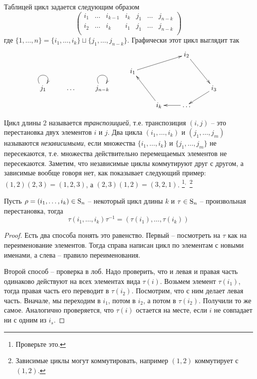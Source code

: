 Таблицей цикл задается следующим образом
\[
\begin{pmatrix}
{i_1}&{\ldots}&{i_{k-1}}&{i_k}&{j_1}&{\ldots}&{j_{n-k}}\\
{i_2}&{\ldots}&{i_k}&{i_1}&{j_{1}}&{\ldots}&{j_{n-k}}\\
\end{pmatrix}
\]
где $\{1,\ldots,n\} = \{i_1,\ldots,i_k\}\sqcup\{j_1,\ldots,j_{n-k}\}$.
Графически этот цикл выглядит так
\[
\xymatrix@R=10pt{
	{}&{}&{}&{}&{}&{i_2}\ar[rdd]&{}\\
	{}&{}&{}&{i_1}\ar[urr]&{}&{}&{}\\
	{j_1}\ar@(ul,ur)&{\ldots}&{j_{n-k}}\ar@(ul,ur)&{}&{}&{}&{i_3}\ar[dl]\\
	{}&{}&{}&{}&{i_k}\ar[uul]&{\ldots}\ar[l]&{}\\
}
\]

Цикл длины $2$ называется {\it транспозицией}, т.е. транспозиция $(i,j)$ -- это перестановка двух элементов $i$ и $j$.
Два цикла $(i_1,\ldots,i_k)$ и $(j_1,\ldots,j_m)$ называются {\it независимыми}, если множества $\{i_1,\ldots,i_k\}$ и $\{j_1,\ldots,j_m\}$ не пересекаются, т.е. множества действительно перемещаемых элементов не пересекаются.
Заметим, что независимые циклы коммутируют друг с другом, а зависимые вообще говоря нет, как показывает следующий пример: $(1,2)(2,3) = (1,2,3)$, а $(2,3)(1,2) = (3,2,1)$.%
\footnote{Проверьте это.}${}^{,\,}$%
\footnote{Зависимые циклы могут коммутировать, например $(1,2)$ коммутирует с $(1,2)$.}

\begin{claim}
\label{claim:CycleRename}
Пусть $\rho = (i_1,\ldots, i_k)\in\operatorname{S}_{n}$ -- некоторый цикл длины $k$ и $\tau\in\operatorname{S}_{n}$ -- произвольная перестановка, тогда 
\[
\tau(i_1,\ldots,i_k)\tau^{-1} = (\tau(i_1),\ldots,\tau(i_k))
\]
\end{claim}
\begin{proof}
Есть два способа понять это равенство.
Первый -- посмотреть на $\tau$ как на переименование элементов.
Тогда справа написан цикл по элементам с новыми именами, а слева -- правило переименования.

Второй способ -- проверка в лоб.
Надо проверить, что и левая и правая часть одинаково действуют на всех элементах вида $\tau(i)$.
Возьмем элемент $\tau(i_1)$, тогда правая часть его переводит в $\tau(i_2)$.
Посмотрим, что с ним делает левая часть.
Вначале, мы переходим в $i_1$, потом в $i_2$, а потом в $\tau(i_2)$.
Получили то же самое.
Аналогично проверяется, что $\tau(i)$ остается на месте, если $i$ не совпадает ни с одним из $i_s$.
\end{proof}

